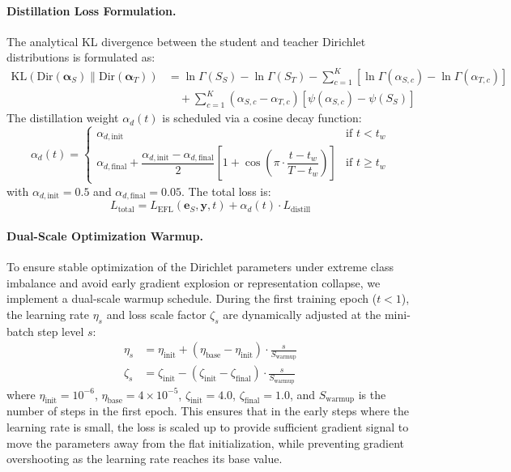 \documentclass[letterpaper]{article} %
\newcommand{\Dir}{\text{Dir}}
\newcommand{\KL}{\text{KL}}
\begin{document}
\paragraph{Distillation Loss Formulation.}
The analytical KL divergence between the student and teacher Dirichlet distributions is formulated as:
\begin{align}
    \KL(\Dir(\bm{\alpha}_S) \| \Dir(\bm{\alpha}_T)) &= \ln\Gamma(S_S) - \ln\Gamma(S_T) - \sum_{c=1}^K \left[\ln\Gamma(\alpha_{S,c}) - \ln\Gamma(\alpha_{T,c})\right] \nonumber \\
    &\quad + \sum_{c=1}^K (\alpha_{S,c} - \alpha_{T,c})\left[\psi(\alpha_{S,c}) - \psi(S_S)\right] \label{eq:dir_kl_full_app}
\end{align}
The distillation weight $\alpha_d(t)$ is scheduled via a cosine decay function:
\begin{equation}\label{eq:alpha_d}
    \alpha_d(t) = \begin{cases}
        \alpha_{d,\text{init}} & \text{if } t < t_w \\[6pt]
        \alpha_{d,\text{final}} + \dfrac{\alpha_{d,\text{init}} - \alpha_{d,\text{final}}}{2}\left[1 + \cos\!\left(\pi \cdot \dfrac{t - t_w}{T - t_w}\right)\right] & \text{if } t \ge t_w
    \end{cases}
\end{equation}
with $\alpha_{d,\text{init}} = 0.5$ and $\alpha_{d,\text{final}} = 0.05$. The total loss is:
\begin{equation}\label{eq:total_loss_app}
    L_{\text{total}} = L_{\text{EFL}}(\bm{e}_S, \bm{y}, t) + \alpha_d(t) \cdot L_{\text{distill}}
\end{equation}

\paragraph{Dual-Scale Optimization Warmup.}
To ensure stable optimization of the Dirichlet parameters under extreme class imbalance and avoid early gradient explosion or representation collapse, we implement a dual-scale warmup schedule. During the first training epoch ($t < 1$), the learning rate $\eta_s$ and loss scale factor $\zeta_s$ are dynamically adjusted at the mini-batch step level $s$:
\begin{align}
    \eta_s &= \eta_{\text{init}} + (\eta_{\text{base}} - \eta_{\text{init}}) \cdot \frac{s}{S_{\text{warmup}}} \\
    \zeta_s &= \zeta_{\text{init}} - (\zeta_{\text{init}} - \zeta_{\text{final}}) \cdot \frac{s}{S_{\text{warmup}}}
\end{align}
where $\eta_{\text{init}} = 10^{-6}$, $\eta_{\text{base}} = 4 \times 10^{-5}$, $\zeta_{\text{init}} = 4.0$, $\zeta_{\text{final}} = 1.0$, and $S_{\text{warmup}}$ is the number of steps in the first epoch. This ensures that in the early steps where the learning rate is small, the loss is scaled up to provide sufficient gradient signal to move the parameters away from the flat initialization, while preventing gradient overshooting as the learning rate reaches its base value.
\end{document}
